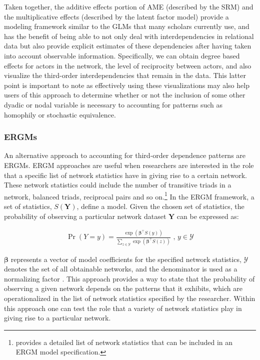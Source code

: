 \documentclass[11pt,pdflatex]{elsarticle}
\begin{document}
Taken together, the additive effects portion of AME (described by the SRM) and the multiplicative effects (described by the latent factor model) provide a modeling framework similar to the GLMs that many scholars currently use, and has the benefit of being able to not only deal with interdependencies in relational data but also provide explicit estimates of these dependencies after having taken into account observable information. Specifically, we can obtain degree based effects for actors in the network, the level of reciprocity between actors, and also visualize the third-order interdependencies that remain in the data. This latter point is important to note as effectively using these visualizations may also help users of this approach to determine whether or not the inclusion of some other dyadic or nodal variable is necessary to accounting for patterns such as homophily or stochastic equivalence. 

\subsubsection{\textbf{ERGMs}}

An alternative approach to accounting for third-order dependence patterns are ERGMs. ERGM approaches are useful when researchers are interested in the role that a specific list of network statistics have in giving rise to a certain network. These network statistics could include the number of transitive triads in a network, balanced triads, reciprocal pairs and so on.\footnote{\citet{snijders:etal:2006} provides a detailed list of network statistics that can be included in an ERGM model specification.} In the ERGM framework, a set of statistics, $S(\mathbf{Y})$, define a model. Given the chosen set of statistics, the probability of observing a particular network dataset $\mathbf{Y}$ can be expressed as:

\begin{align}
\Pr(Y = y) = \frac{ \exp( \bm\beta^{\top} S(y)  )  }{ \sum_{z \in \mathcal{Y}} \exp( \bm\beta^{\top} S(z)  )  } \text{ ,  } y \in \mathcal{Y}
\label{eqn:ergm}
\end{align}

$\bm\beta$ represents a vector of model coefficients for the specified network statistics, $\mathcal{Y}$ denotes the set of all obtainable networks, and the denominator is used as a normalizing factor \citep{hunter:etal:2008}. This approach provides a way to state that the probability of observing a given network depends on the patterns that it exhibits, which are operationalized in the list of network statistics specified by the researcher. Within this approach one can test the role that a variety of network statistics play in giving rise to a particular network. 
\end{document}
